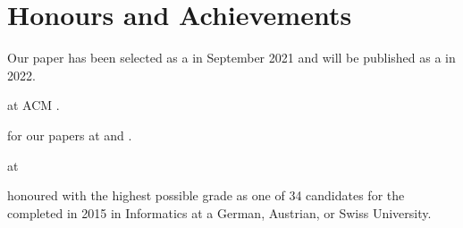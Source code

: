 \section{Honours and Achievements}
\begin{cvitemize}
    \item Our  paper has been selected as a  in September 2021 and will be published as a  in 2022.
    \item {} at ACM .
    \item {} for our papers at  and .
    \item {} at
        \begin{inlineItemize}
        \item {}
        \item {}
        \end{inlineItemize}
    \item {} honoured with the highest possible grade \newline
           as one of 34 candidates for the  completed in 2015 in Informatics at a German, Austrian, or Swiss University.
\end{cvitemize}